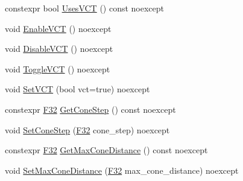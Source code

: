 \begin{DoxyCompactItemize}
constexpr bool \mbox{\hyperlink{classmage_1_1rendering_1_1_voxelization_settings_a50ce0473e8e9fd22527d4f295c023176}{Uses\+V\+CT}} () const noexcept
\item 
void \mbox{\hyperlink{classmage_1_1rendering_1_1_voxelization_settings_a1f08a9e6c02ce6c3e392cdb1ad30f75e}{Enable\+V\+CT}} () noexcept
\item 
void \mbox{\hyperlink{classmage_1_1rendering_1_1_voxelization_settings_a7092d02a0878dad9ec4fa21ce1024147}{Disable\+V\+CT}} () noexcept
\item 
void \mbox{\hyperlink{classmage_1_1rendering_1_1_voxelization_settings_a930c8f4d3723e67e8cbfc2b41533ead8}{Toggle\+V\+CT}} () noexcept
\item 
void \mbox{\hyperlink{classmage_1_1rendering_1_1_voxelization_settings_a394b58dd3d414a406fd874f7e53b211f}{Set\+V\+CT}} (bool vct=true) noexcept
\item 
constexpr \mbox{\hyperlink{namespacemage_aa97e833b45f06d60a0a9c4fc22ae02c0}{F32}} \mbox{\hyperlink{classmage_1_1rendering_1_1_voxelization_settings_aa22362a297717dc7d57c50ba5d4f814c}{Get\+Cone\+Step}} () const noexcept
\item 
void \mbox{\hyperlink{classmage_1_1rendering_1_1_voxelization_settings_a626f15dab0fa74a7b4e0435b64f0c024}{Set\+Cone\+Step}} (\mbox{\hyperlink{namespacemage_aa97e833b45f06d60a0a9c4fc22ae02c0}{F32}} cone\+\_\+step) noexcept
\item 
constexpr \mbox{\hyperlink{namespacemage_aa97e833b45f06d60a0a9c4fc22ae02c0}{F32}} \mbox{\hyperlink{classmage_1_1rendering_1_1_voxelization_settings_aa79b36e2c7ef50513548512f2cedfb6b}{Get\+Max\+Cone\+Distance}} () const noexcept
\item 
void \mbox{\hyperlink{classmage_1_1rendering_1_1_voxelization_settings_a137c4c2186b5034f546d0b876cd0633e}{Set\+Max\+Cone\+Distance}} (\mbox{\hyperlink{namespacemage_aa97e833b45f06d60a0a9c4fc22ae02c0}{F32}} max\+\_\+cone\+\_\+distance) noexcept
\end{DoxyCompactItemize}
